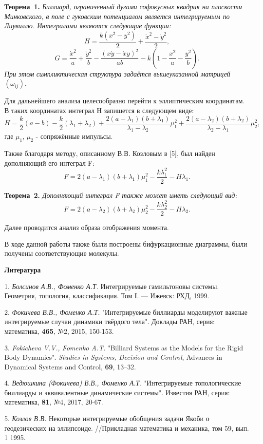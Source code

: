 \textbf{Теорема~1.} {\it Биллиард, ограниченный дугами софокусных квадрик на плоскости Минковского, в поле с гуковским потенциалом является интегрируемым по Лиувиллю. Интегралами являются следующие функции:
$$H=\frac{k(x^2-y^2)}{2}+\frac{{\dot{x}}^2-{\dot{y}}^2}{2},$$
$$G=\frac{{\dot{x}}^2}{a}+\frac{{\dot{y}}^2}{b}-\frac{{(x\dot{y}-\dot{x}y)}^2}{ab}-k(1-\frac{x^2}{a}-\frac{y^2}{b}).$$ При этом симпликтическая структура задаётся вышеуказанной матрицей $(\omega_{ij})$.}

Для дальнейшего анализа целесообразно перейти к эллиптическим координатам. В таких координатах интеграл H запишется в следующем виде:
$$H=\frac{k}{2}(a-b)-\frac{k}{2}(\lambda_1+\lambda_2)+\frac{2(a-\lambda_1)(b+\lambda_1)}{\lambda_1-\lambda_2}\mu_1^2+\frac{2(a-\lambda_2)(b+\lambda_2)}{\lambda_2-\lambda_1}\mu_2^2,$$
где $\mu_1$, $\mu_2$ - сопряжённые импульсы.

Также благодаря методу, описанному В.В. Козловым в [5], был найден дополняющий его интеграл F:
$$F=2(a-\lambda_1)(b+\lambda_1)\mu_1^2-\frac{k\lambda_1^2}{2}-H\lambda_1.$$

\textbf{Теорема~2.} {\it Дополняющий интеграл F также может иметь следующий вид:
$$F=2(a-\lambda_2)(b+\lambda_2)\mu_2^2-\frac{k\lambda_2^2}{2}-H\lambda_2.$$}

Далее проводится анализ образа отображения момента.

В ходе данной работы также были построены бифуркационные диаграммы, были получены соответствующие молекулы.

\smallskip \centerline {\bf Литература} \nopagebreak

1. {\it Болсинов А.В., Фоменко А.Т.} Интегрируемые гамильтоновы системы. Геометрия, топология, классификация. Том I. — Ижевск: РХД, 1999.

2. {\it Фокичева В.В., Фоменко А.Т.} "Интегрируемые биллиарды моделируют важные интегрируемые случаи динамики твёрдого тела". Доклады РАН, серия: математика, {\bf 465}, №2, 2015, 150-153.

3. {\it Fokicheva V.V., Fomenko A.T.} "Billiard Systems as the Models for the Rigid
Body Dynamics". {\it Studies in Systems, Decision and Control}, Advances in Dynamical
Systems and Control, {\bf 69}, 13–32.

4. {\it Ведюшкина (Фокичева) В.В., Фоменко А.Т.} "Интегрируемые топологические биллиарды и эквивалентные динамические системы". Известия РАН, серия: математика, {\bf 81}, №4, 2017, 20-67.

5. {\it Козлов В.В.} Некоторые интегрируемые обобщения задачи Якоби о геодезических на эллипсоиде. //Прикладная математика и механика, том 59, вып. 1 1995.

